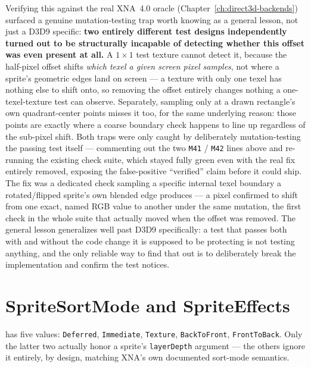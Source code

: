 Verifying this against the real XNA~4.0 oracle (Chapter~\ref{ch:direct3d-backends}) surfaced a
genuine mutation-testing trap worth knowing as a general lesson, not just a D3D9 specific:
\textbf{two entirely different test designs independently turned out to be structurally
incapable of detecting whether this offset was even present at all.} A $1\times1$ test texture
cannot detect it, because the half-pixel offset shifts \emph{which texel a given screen pixel
samples}, not where a sprite's geometric edges land on screen --- a texture with only one texel
has nothing else to shift onto, so removing the offset entirely changes nothing a
one-texel-texture test can observe. Separately, sampling only at a drawn rectangle's own
quadrant-center points misses it too, for the same underlying reason: those points are exactly
where a coarse boundary check happens to line up regardless of the sub-pixel shift. Both traps
were only caught by deliberately mutation-testing the passing test itself --- commenting out
the two \texttt{M41} / \texttt{M42} lines above and re-running the existing check suite, which
stayed fully green even with the real fix entirely removed, exposing the false-positive
``verified'' claim before it could ship. The fix was a dedicated check sampling a specific
internal texel boundary a rotated/flipped sprite's own blended edge produces --- a pixel
confirmed to shift from one exact, named RGB value to another under the same mutation, the
first check in the whole suite that actually moved when the offset was removed. The general
lesson generalizes well past D3D9 specifically: a test that passes both with and without the
code change it is supposed to be protecting is not testing anything, and the only reliable way
to find that out is to deliberately break the implementation and confirm the test notices.

\section{SpriteSortMode and SpriteEffects}

 has five values: \texttt{Deferred}, \texttt{Immediate},
\texttt{Texture}, \texttt{BackToFront}, \texttt{FrontToBack}. Only the latter two actually
honor a sprite's \texttt{layerDepth} argument --- the others ignore it entirely, by design,
matching XNA's own documented sort-mode semantics.

